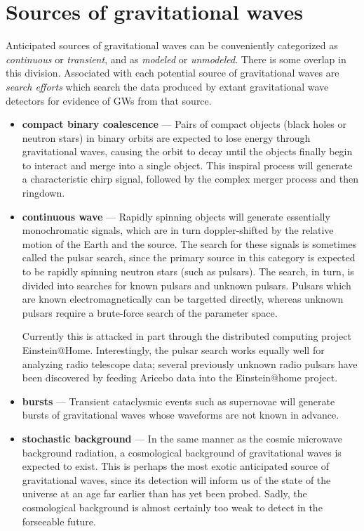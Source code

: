 \section{Sources of gravitational waves}
Anticipated sources of gravitational waves can be conveniently
categorized as \emph{continuous} or \emph{transient}, and as
\emph{modeled} or \emph{unmodeled}.  There is some overlap in this
division.  Associated with each potential source of gravitational
waves are \emph{search efforts} which search the data produced by
extant gravitational wave detectors for evidence of GWs from that 
source.

\begin{itemize}

\item \textbf{compact binary coalescence} --- Pairs of compact objects
  (black holes or neutron stars) in binary orbits are expected to lose
  energy through gravitational waves, causing the orbit to decay until
  the objects finally begin to interact and merge into a single
  object.  This inspiral process will generate a characteristic chirp
  signal, followed by the complex merger process and then ringdown.

\item \textbf{continuous wave} --- Rapidly spinning objects will
  generate essentially monochromatic signals, which are in turn
  doppler-shifted by the relative motion of the Earth and the source.
  The search for these signals is sometimes called the pulsar search, since the primary source
  in this category is expected to be rapidly spinning neutron stars
  (such as pulsars).  The search, in turn, is divided into searches
  for known pulsars and unknown pulsars.  Pulsars which are known
  electromagnetically can be targetted directly, whereas unknown
  pulsars require a brute-force search of the parameter space.

  Currently this is attacked in part through the distributed computing
  project Einstein@Home.  Interestingly, the pulsar search 
  works equally well for analyzing radio telescope data; 
  several previously
  unknown radio pulsars have been discovered by feeding Aricebo data
  into the Einstein@home project\cite{Knispel2010Pulsar}.  

\item \textbf{bursts} --- Transient cataclysmic events such as
  supernovae will generate bursts of gravitational waves whose
  waveforms are not known in advance.  

\item \textbf{stochastic background} --- In the same manner as the
  cosmic microwave background radiation, a cosmological background of
  gravitational waves is expected to exist.  This is perhaps the most
  exotic anticipated source of gravitational waves, since its
  detection will inform us of the state of the universe at an age far
  earlier than has yet been probed.  Sadly, the cosmological
  background is almost certainly too weak to detect in the forseeable
  future.


\end{itemize}
